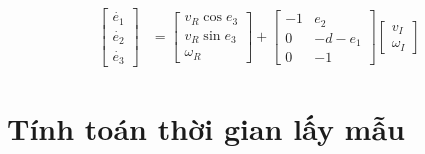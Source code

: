           \begin{align}
               \begin{bmatrix}
                    \dot{e_1} \\
                    \dot{e_2} \\
                    \dot{e_3}
                    \end{bmatrix} &= \begin{bmatrix}
                    v_R \cos e_3 \\
                    v_R \sin e_3 \\
                    \omega_R
                    \end{bmatrix} + \begin{bmatrix}
                    -1 & e_2 \\
                    0 & -d - e_1 \\
                    0 & -1
                    \end{bmatrix} \begin{bmatrix}
                    v_I \\
                    \omega_I
               \end{bmatrix}
               \label{c5_e7}
          \end{align}       
     \section{Tính toán thời gian lấy mẫu}
